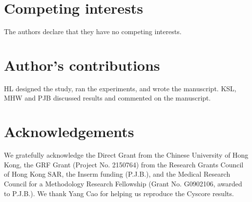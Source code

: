 \documentclass[linenumbers]{bmcart}
\begin{document}
\begin{backmatter}

\section*{Competing interests}
The authors declare that they have no competing interests.

\section*{Author's contributions}
HL designed the study, ran the experiments, and wrote the manuscript. KSL, MHW and PJB discussed results and commented on the manuscript.

\section*{Acknowledgements}
We gratefully acknowledge the Direct Grant from the Chinese University of Hong Kong, the GRF Grant (Project No. 2150764) from the Research Grants Council of Hong Kong SAR, the Inserm funding (P.J.B.), and the Medical Research Council for a Methodology Research Fellowship (Grant No. G0902106, awarded to P.J.B.). We thank Yang Cao for helping us reproduce the Cyscore results.





\end{backmatter}
\end{document}
